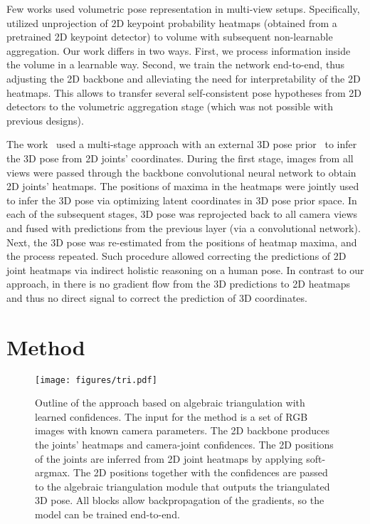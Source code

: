 \documentclass[10pt,twocolumn,letterpaper]{article}
\begin{document}
Few works used volumetric pose representation in multi-view setups\cite{Pavlakos2017,Joo_2017_TPAMI}. Specifically, \cite{Joo_2017_TPAMI} utilized unprojection of 2D keypoint probability heatmaps (obtained from a pretrained 2D keypoint detector) to volume with subsequent non-learnable aggregation. Our work differs in two ways. First, we process information inside the volume in a learnable way. Second, we train the network end-to-end, thus adjusting the 2D backbone and alleviating the need for interpretability of the 2D heatmaps. This allows to transfer several self-consistent pose hypotheses from 2D detectors to the volumetric aggregation stage (which was not possible with previous designs).

The work~\cite{Tome2018} used a multi-stage approach with an external 3D pose prior~\cite{tome2017lifting} to infer the 3D pose from 2D joints' coordinates. During the first stage, images from all views were passed through the backbone convolutional neural network to obtain 2D joints' heatmaps. The positions of maxima in the heatmaps were jointly used to infer the 3D pose via optimizing latent coordinates in 3D pose prior space. In each of the subsequent stages, 3D pose was reprojected back to all camera views and fused with predictions from the previous layer (via a convolutional network). Next, the 3D pose was re-estimated from the positions of heatmap maxima, and the process repeated. Such procedure allowed correcting the predictions of 2D joint heatmaps via indirect holistic reasoning on a human pose.
In contrast to our approach, in \cite{Tome2018} there is no gradient flow from the 3D predictions to 2D heatmaps and thus no direct signal to correct the prediction of 3D coordinates. 


 \newcommand{\vect}[1]{\mathbf{#1}}
\newcommand{\bm}[1]{{#1}}

\section{Method}

\begin{figure*}[t]
    \centering
    \texttt{[image: figures/tri.pdf]}
    \caption{Outline of the approach based on algebraic triangulation with learned confidences. The input for the method is a set of RGB images with known camera parameters. The 2D backbone produces the joints' heatmaps and camera-joint confidences. The 2D positions of the joints are inferred from 2D joint heatmaps by applying soft-argmax. The 2D positions together with the confidences are passed to the algebraic triangulation module that outputs the triangulated 3D pose. All blocks allow backpropagation of the gradients, so the model can be trained end-to-end.}
    \label{fig:triang}
\end{figure*}
\end{document}
